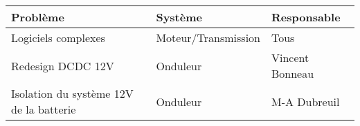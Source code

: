 \begin{tabularx}{\linewidth}{
    |>{\hsize=1.7\hsize}X|%
    >{\hsize=0.5\hsize}X|%
    >{\hsize=0.8\hsize}X|%
  }
    \hline
    \textbf{Problème} & \textbf{Système} & \textbf{Responsable} \\\hline
     Logiciels complexes & Moteur/Transmission & Tous \\\hline
     Redesign DCDC 12V & Onduleur & Vincent Bonneau \\\hline
     Isolation du système 12V de la batterie & Onduleur & M-A Dubreuil \\\hline
  \end{tabularx}
    
    
